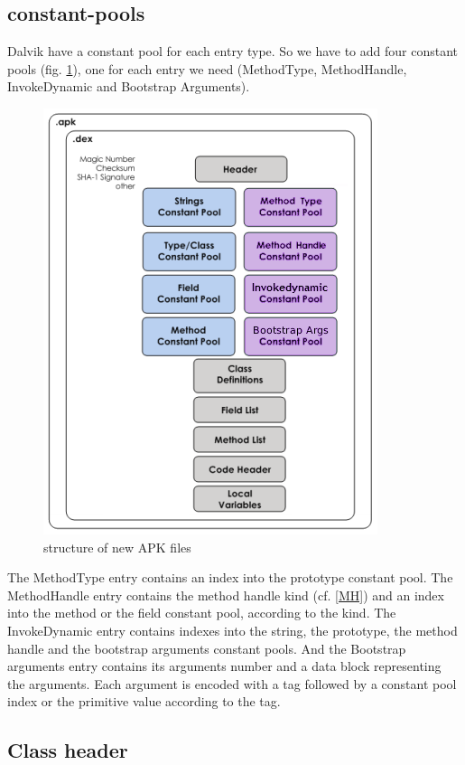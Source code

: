 \documentclass{sig-alternate}
\begin{document}
  \subsection{constant-pools}

    Dalvik have a constant pool for each entry type.
    So we have to add four constant pools (fig. \ref{SNA}), one for each entry we need
    (MethodType, MethodHandle, InvokeDynamic and Bootstrap Arguments).

    \begin{figure}[!h]
      \centering \includegraphics[width=.5\columnwidth]{structure-apk-292.png}
      \caption{structure of new APK files}
      \label{SNA}
    \end{figure}

    The MethodType entry contains an index into the prototype constant pool.
    The MethodHandle entry contains the method handle kind (cf. \ref{MH})
    and an index into the method or the field constant pool, according to the kind.
    The InvokeDynamic entry contains indexes into the string, the prototype,
    the method handle and the bootstrap arguments constant pools.
    And the Bootstrap arguments entry contains its arguments number
    and a data block representing the arguments.
    Each argument is encoded with a tag
    followed by a constant pool index or the primitive value according to the tag.

    
    
    
    

  \subsection{Class header}
\end{document}
